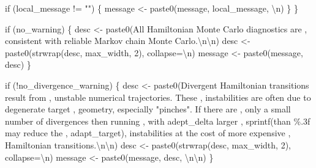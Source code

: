 \documentclass[
  letterpaper,
  DIV=11,
  numbers=noendperiod]{scrartcl}
\newenvironment{Shaded}{\begin{snugshade}}{\end{snugshade}}
\newcommand{\AttributeTok}[1]{\textcolor[rgb]{0.40,0.45,0.13}{#1}}
\newcommand{\ControlFlowTok}[1]{\textcolor[rgb]{0.00,0.23,0.31}{#1}}
\newcommand{\DecValTok}[1]{\textcolor[rgb]{0.68,0.00,0.00}{#1}}
\newcommand{\FunctionTok}[1]{\textcolor[rgb]{0.28,0.35,0.67}{#1}}
\newcommand{\NormalTok}[1]{\textcolor[rgb]{0.00,0.23,0.31}{#1}}
\newcommand{\OtherTok}[1]{\textcolor[rgb]{0.00,0.23,0.31}{#1}}
\newcommand{\SpecialCharTok}[1]{\textcolor[rgb]{0.37,0.37,0.37}{#1}}
\newcommand{\StringTok}[1]{\textcolor[rgb]{0.13,0.47,0.30}{#1}}
\begin{document}
\begin{Shaded}
\begin{Highlighting}[]
    \ControlFlowTok{if}\NormalTok{ (local\_message }\SpecialCharTok{!=} \StringTok{""}\NormalTok{) \{}
\NormalTok{      message }\OtherTok{\textless{}{-}} \FunctionTok{paste0}\NormalTok{(message, local\_message, }\StringTok{\textquotesingle{}}\SpecialCharTok{\textbackslash{}n}\StringTok{\textquotesingle{}}\NormalTok{)}
\NormalTok{    \}}
\NormalTok{  \}}

  \ControlFlowTok{if}\NormalTok{ (no\_warning) \{}
\NormalTok{    desc }\OtherTok{\textless{}{-}} \FunctionTok{paste0}\NormalTok{(}\StringTok{\textquotesingle{}All Hamiltonian Monte Carlo diagnostics are \textquotesingle{}}\NormalTok{,}
                   \StringTok{\textquotesingle{}consistent with reliable Markov chain Monte Carlo.}\SpecialCharTok{\textbackslash{}n\textbackslash{}n}\StringTok{\textquotesingle{}}\NormalTok{)}
\NormalTok{    desc }\OtherTok{\textless{}{-}} \FunctionTok{paste0}\NormalTok{(}\FunctionTok{strwrap}\NormalTok{(desc, max\_width, }\DecValTok{2}\NormalTok{), }\AttributeTok{collapse=}\StringTok{\textquotesingle{}}\SpecialCharTok{\textbackslash{}n}\StringTok{\textquotesingle{}}\NormalTok{)}
\NormalTok{    message }\OtherTok{\textless{}{-}} \FunctionTok{paste0}\NormalTok{(message, desc)}
\NormalTok{  \}}
  
  \ControlFlowTok{if}\NormalTok{ (}\SpecialCharTok{!}\NormalTok{no\_divergence\_warning) \{}
\NormalTok{    desc }\OtherTok{\textless{}{-}} \FunctionTok{paste0}\NormalTok{(}\StringTok{\textquotesingle{}Divergent Hamiltonian transitions result from \textquotesingle{}}\NormalTok{,}
                   \StringTok{\textquotesingle{}unstable numerical trajectories.  These \textquotesingle{}}\NormalTok{,}
                   \StringTok{\textquotesingle{}instabilities are often due to degenerate target \textquotesingle{}}\NormalTok{,}
                   \StringTok{\textquotesingle{}geometry, especially "pinches".  If there are \textquotesingle{}}\NormalTok{,}
                   \StringTok{\textquotesingle{}only a small number of divergences then running \textquotesingle{}}\NormalTok{,}
                   \StringTok{\textquotesingle{}with adept\_delta larger \textquotesingle{}}\NormalTok{,}
                   \FunctionTok{sprintf}\NormalTok{(}\StringTok{\textquotesingle{}than \%.3f may reduce the \textquotesingle{}}\NormalTok{, adapt\_target),}
                   \StringTok{\textquotesingle{}instabilities at the cost of more expensive \textquotesingle{}}\NormalTok{,}
                   \StringTok{\textquotesingle{}Hamiltonian transitions.}\SpecialCharTok{\textbackslash{}n\textbackslash{}n}\StringTok{\textquotesingle{}}\NormalTok{)}
\NormalTok{    desc }\OtherTok{\textless{}{-}} \FunctionTok{paste0}\NormalTok{(}\FunctionTok{strwrap}\NormalTok{(desc, max\_width, }\DecValTok{2}\NormalTok{), }\AttributeTok{collapse=}\StringTok{\textquotesingle{}}\SpecialCharTok{\textbackslash{}n}\StringTok{\textquotesingle{}}\NormalTok{)}
\NormalTok{    message }\OtherTok{\textless{}{-}} \FunctionTok{paste0}\NormalTok{(message, desc, }\StringTok{\textquotesingle{}}\SpecialCharTok{\textbackslash{}n\textbackslash{}n}\StringTok{\textquotesingle{}}\NormalTok{)}
\NormalTok{  \}}


\end{Highlighting}
\end{Shaded}
\end{document}
